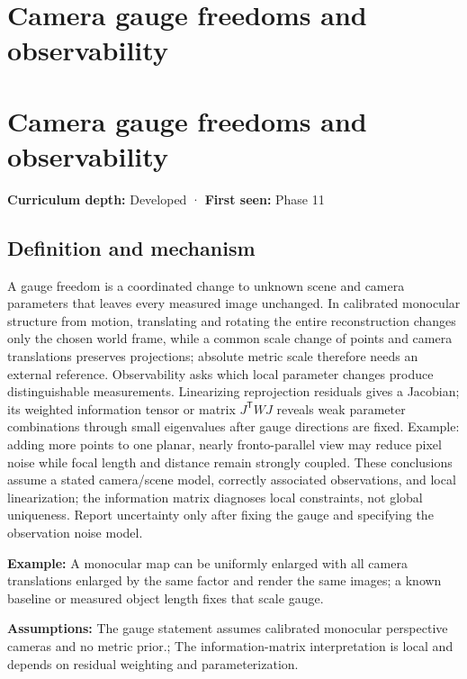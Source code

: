 \hypertarget{appendix-113f0267e5f4}{}
\section*{Camera gauge freedoms and observability}
\section{Camera gauge freedoms and observability}\label{appendix-113f0267e5f4-camera-gauge-freedoms-and-observability}

\textbf{Curriculum depth:} Developed · \textbf{First seen:} Phase 11

\subsection{Definition and mechanism}\label{appendix-113f0267e5f4-definition-and-mechanism}

A gauge freedom is a coordinated change to unknown scene and camera parameters that leaves every measured image unchanged. In calibrated monocular structure from motion, translating and rotating the entire reconstruction changes only the chosen world frame, while a common scale change of points and camera translations preserves projections; absolute metric scale therefore needs an external reference. Observability asks which local parameter changes produce distinguishable measurements. Linearizing reprojection residuals gives a Jacobian; its weighted information tensor or matrix \(J^{\mathsf T}WJ\) reveals weak parameter combinations through small eigenvalues after gauge directions are fixed. Example: adding more points to one planar, nearly fronto-parallel view may reduce pixel noise while focal length and distance remain strongly coupled. These conclusions assume a stated camera/scene model, correctly associated observations, and local linearization; the information matrix diagnoses local constraints, not global uniqueness. Report uncertainty only after fixing the gauge and specifying the observation noise model.

\textbf{Example:} A monocular map can be uniformly enlarged with all camera translations enlarged by the same factor and render the same images; a known baseline or measured object length fixes that scale gauge.

\textbf{Assumptions:} The gauge statement assumes calibrated monocular perspective cameras and no metric prior.; The information-matrix interpretation is local and depends on residual weighting and parameterization.

